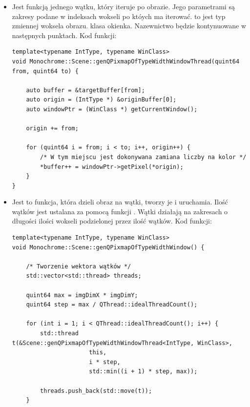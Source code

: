 \begin{itemize}
    \item {}

          Jest funkcją jednego wątku, który iteruje po obrazie.
          Jego parametrami są zakresy podane w indeksach wokseli po któych ma iterować.
           to jest typ zmiennej woksela obrazu.
           klasa okienka.
          Nazewnictwo będzie kontynuowane w następnych punktach.
          Kod funkcji:
          \begin{lstlisting}
template<typename IntType, typename WinClass>
void Monochrome::Scene::genQPixmapOfTypeWidthWindowThread(quint64 from, quint64 to) {

    auto buffer = &targetBuffer[from];
    auto origin = (IntType *) &originBuffer[0];
    auto windowPtr = (WinClass *) getCurrentWindow();

    origin += from;

    for (quint64 i = from; i < to; i++, origin++) {
        /* W tym miejscu jest dokonywana zamiana liczby na kolor */
        *buffer++ = windowPtr->getPixel(*origin);
    }
}
\end{lstlisting}

    \item {}

          Jest to funkcja, która dzieli obraz na wątki, tworzy je i uruchamia.
          Ilość wątków jest ustalana za pomocą funkcji .
          Wątki działają na zakresach o długości ilości wokseli podzielonej przez ilość wątków.
          Kod funkcji:
          \begin{lstlisting}
template<typename IntType, typename WinClass>
void Monochrome::Scene::genQPixmapOfTypeWidthWindow() {

    /* Tworzenie wektora wątków */
    std::vector<std::thread> threads;

    quint64 max = imgDimX * imgDimY;
    quint64 step = max / QThread::idealThreadCount();

    for (int i = 1; i < QThread::idealThreadCount(); i++) {
        std::thread t(&Scene::genQPixmapOfTypeWidthWindowThread<IntType, WinClass>,
                      this,
                      i * step,
                      std::min((i + 1) * step, max));

        threads.push_back(std::move(t));
    }


\end{lstlisting}
\end{itemize}
